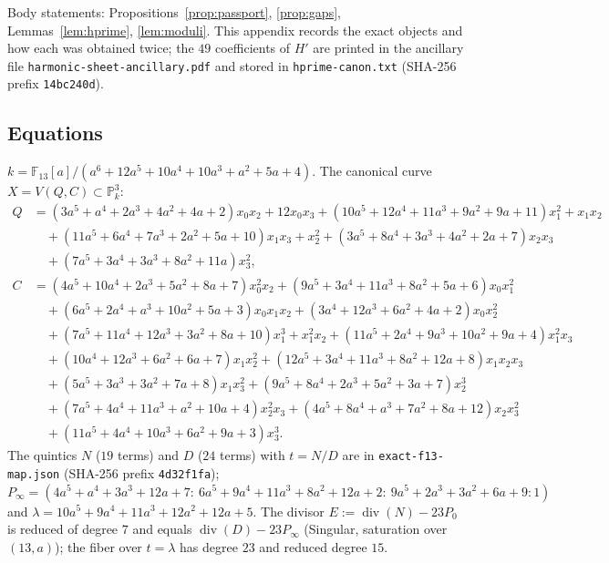 \documentclass[11pt]{amsart}
\newcommand{\FF}{\mathbb{F}}
\newcommand{\PP}{\mathbb{P}}
\theoremstyle{plain}
\theoremstyle{definition}
\begin{document}
Body statements: Propositions~\ref{prop:passport}, \ref{prop:gaps},
Lemmas~\ref{lem:hprime}, \ref{lem:moduli}. This appendix records the
exact objects and how each was obtained twice; the $49$ coefficients
of $H'$ are printed in the ancillary file
\texttt{harmonic-sheet-ancillary.pdf} and stored in
\texttt{hprime-canon.txt} (SHA-256 prefix \texttt{14bc240d}).

\subsection*{Equations}
$k=\FF_{13}[a]/(a^6+12a^5+10a^4+10a^3+a^2+5a+4)$. The canonical curve
$X=V(Q,C)\subset\PP^3_k$:
\begin{align*}
Q&=(3a^5{+}a^4{+}2a^3{+}4a^2{+}4a{+}2)x_0x_2+12x_0x_3+(10a^5{+}12a^4{+}11a^3{+}9a^2{+}9a{+}11)x_1^2+x_1x_2\\
 &\quad+(11a^5{+}6a^4{+}7a^3{+}2a^2{+}5a{+}10)x_1x_3+x_2^2+(3a^5{+}8a^4{+}3a^3{+}4a^2{+}2a{+}7)x_2x_3\\
 &\quad+(7a^5{+}3a^4{+}3a^3{+}8a^2{+}11a)x_3^2,\\
C&=(4a^5{+}10a^4{+}2a^3{+}5a^2{+}8a{+}7)x_0^2x_2+(9a^5{+}3a^4{+}11a^3{+}8a^2{+}5a{+}6)x_0x_1^2\\
 &\quad+(6a^5{+}2a^4{+}a^3{+}10a^2{+}5a{+}3)x_0x_1x_2+(3a^4{+}12a^3{+}6a^2{+}4a{+}2)x_0x_2^2\\
 &\quad+(7a^5{+}11a^4{+}12a^3{+}3a^2{+}8a{+}10)x_1^3+x_1^2x_2+(11a^5{+}2a^4{+}9a^3{+}10a^2{+}9a{+}4)x_1^2x_3\\
 &\quad+(10a^4{+}12a^3{+}6a^2{+}6a{+}7)x_1x_2^2+(12a^5{+}3a^4{+}11a^3{+}8a^2{+}12a{+}8)x_1x_2x_3\\
 &\quad+(5a^5{+}3a^3{+}3a^2{+}7a{+}8)x_1x_3^2+(9a^5{+}8a^4{+}2a^3{+}5a^2{+}3a{+}7)x_2^3\\
 &\quad+(7a^5{+}4a^4{+}11a^3{+}a^2{+}10a{+}4)x_2^2x_3+(4a^5{+}8a^4{+}a^3{+}7a^2{+}8a{+}12)x_2x_3^2\\
 &\quad+(11a^5{+}4a^4{+}10a^3{+}6a^2{+}9a{+}3)x_3^3 .
\end{align*}
The quintics $N$ ($19$ terms) and $D$ ($24$ terms) with $t=N/D$ are in
\texttt{exact-f13-map.json} (SHA-256 prefix \texttt{4d32f1fa});
$P_\infty=(4a^5{+}a^4{+}3a^3{+}12a{+}7:\
6a^5{+}9a^4{+}11a^3{+}8a^2{+}12a{+}2:\ 9a^5{+}2a^3{+}3a^2{+}6a{+}9:1)$
and $\lambda=10a^5+9a^4+11a^3+12a^2+12a+5$. The divisor
$E:=\operatorname{div}(N)-23P_0$ is reduced of degree $7$ and equals
$\operatorname{div}(D)-23P_\infty$ (Singular, saturation over $(13,a)$);
the fiber over $t=\lambda$ has degree $23$ and reduced degree $15$.
\end{document}
